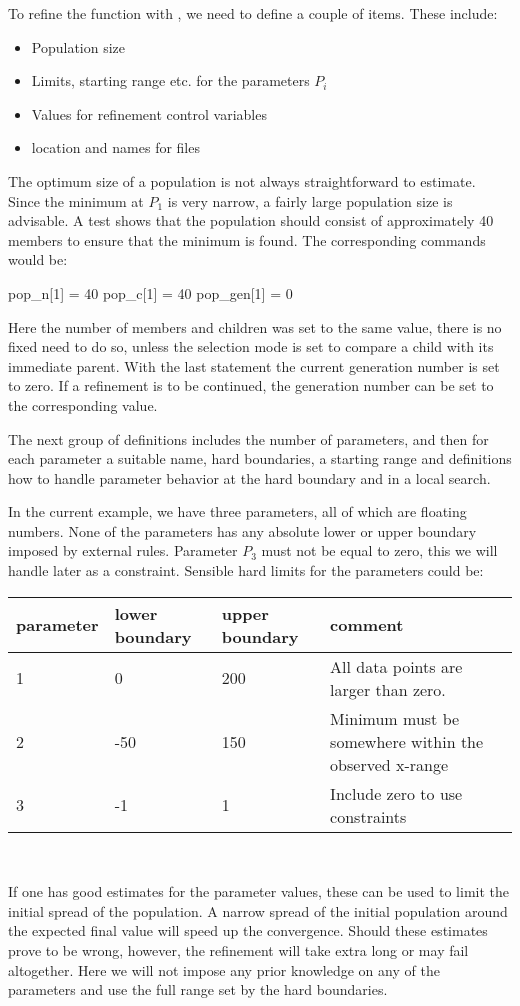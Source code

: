 To refine the function with \diffev, we need to define a couple of
items. These include:
\begin{itemize}
  \item Population size
  \item Limits, starting range etc. for the parameters $P_{i}$
  \item Values for refinement control variables
  \item location and names for files
\end{itemize}

The optimum size of a population is not always straightforward to
estimate. Since the minimum at $P_{1}$ is very narrow, a fairly 
large population size is advisable. A test shows that the population
should consist of approximately 40 members to ensure that the 
minimum is found.  The corresponding commands would be:
\begin{MacVerbatim}
  pop_n[1]   = 40
  pop_c[1]   = 40
  pop_gen[1] =  0
\end{MacVerbatim}
Here the number of members and children was set to the same value,
there is no fixed need to do so, unless the selection mode is set 
to compare a child with its immediate parent. With the last statement
the current generation number is set to zero. If a refinement is to 
be continued, the generation number can be set to the corresponding 
value.

The next group of definitions includes the number of parameters,
and then for each parameter a suitable name, hard boundaries, a
starting range and definitions how to handle parameter behavior 
at the hard boundary and in a local search.

In the current example, we have three parameters, all of which are 
floating numbers. None of the parameters has any absolute lower or
upper boundary imposed by external rules. Parameter $P_{3}$ must
not be equal to zero, this we will handle later as a constraint.
Sensible hard limits for the parameters could be:\\
\begin{tabular}{lp{2cm}p{2cm}p{8cm}}
     parameter & \raggedright{lower boundary}
               & \raggedright{upper boundary}
               & comment\\
     \hline
     1 &   0 & 200 & \raggedright{All data points are larger than zero.}
                     \tabularnewline
     2 & -50 & 150 & \raggedright{Minimum must be somewhere within the 
                                  observed x-range}
                     \tabularnewline
     3 &  -1 &  1  & \raggedright{Include zero to use constraints}
\end{tabular}
\\
\par 
If one has good estimates for the parameter values, these can be used 
to limit the initial spread of the population. A narrow spread of the
initial population around the expected final value will speed up the
convergence. Should these estimates prove to be wrong, however, the 
refinement will take extra long or may fail altogether. Here we will
not impose any prior knowledge on any of the parameters and use the
full range set by the hard boundaries.

